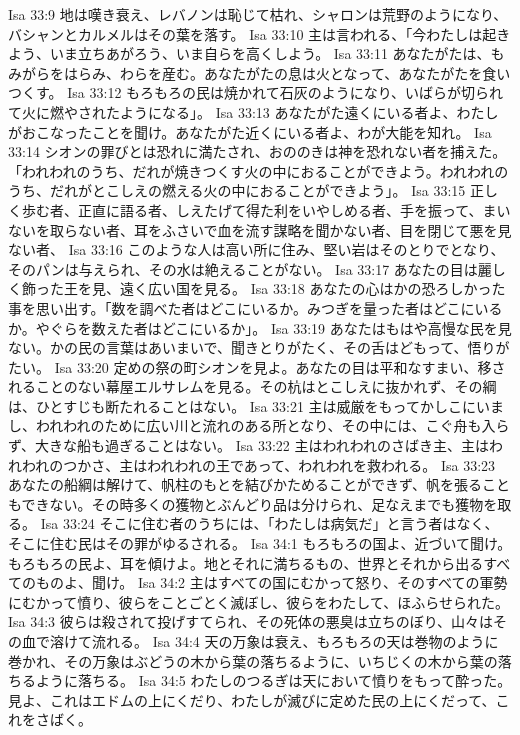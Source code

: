 Isa 33:9  地は嘆き衰え、レバノンは恥じて枯れ、シャロンは荒野のようになり、バシャンとカルメルはその葉を落す。
Isa 33:10  主は言われる、「今わたしは起きよう、いま立ちあがろう、いま自らを高くしよう。
Isa 33:11  あなたがたは、もみがらをはらみ、わらを産む。あなたがたの息は火となって、あなたがたを食いつくす。
Isa 33:12  もろもろの民は焼かれて石灰のようになり、いばらが切られて火に燃やされたようになる」。
Isa 33:13  あなたがた遠くにいる者よ、わたしがおこなったことを聞け。あなたがた近くにいる者よ、わが大能を知れ。
Isa 33:14  シオンの罪びとは恐れに満たされ、おののきは神を恐れない者を捕えた。「われわれのうち、だれが焼きつくす火の中におることができよう。われわれのうち、だれがとこしえの燃える火の中におることができよう」。
Isa 33:15  正しく歩む者、正直に語る者、しえたげて得た利をいやしめる者、手を振って、まいないを取らない者、耳をふさいで血を流す謀略を聞かない者、目を閉じて悪を見ない者、
Isa 33:16  このような人は高い所に住み、堅い岩はそのとりでとなり、そのパンは与えられ、その水は絶えることがない。
Isa 33:17  あなたの目は麗しく飾った王を見、遠く広い国を見る。
Isa 33:18  あなたの心はかの恐ろしかった事を思い出す。「数を調べた者はどこにいるか。みつぎを量った者はどこにいるか。やぐらを数えた者はどこにいるか」。
Isa 33:19  あなたはもはや高慢な民を見ない。かの民の言葉はあいまいで、聞きとりがたく、その舌はどもって、悟りがたい。
Isa 33:20  定めの祭の町シオンを見よ。あなたの目は平和なすまい、移されることのない幕屋エルサレムを見る。その杭はとこしえに抜かれず、その綱は、ひとすじも断たれることはない。
Isa 33:21  主は威厳をもってかしこにいまし、われわれのために広い川と流れのある所となり、その中には、こぐ舟も入らず、大きな船も過ぎることはない。
Isa 33:22  主はわれわれのさばき主、主はわれわれのつかさ、主はわれわれの王であって、われわれを救われる。
Isa 33:23  あなたの船綱は解けて、帆柱のもとを結びかためることができず、帆を張ることもできない。その時多くの獲物とぶんどり品は分けられ、足なえまでも獲物を取る。
Isa 33:24  そこに住む者のうちには、「わたしは病気だ」と言う者はなく、そこに住む民はその罪がゆるされる。
Isa 34:1  もろもろの国よ、近づいて聞け。もろもろの民よ、耳を傾けよ。地とそれに満ちるもの、世界とそれから出るすべてのものよ、聞け。
Isa 34:2  主はすべての国にむかって怒り、そのすべての軍勢にむかって憤り、彼らをことごとく滅ぼし、彼らをわたして、ほふらせられた。
Isa 34:3  彼らは殺されて投げすてられ、その死体の悪臭は立ちのぼり、山々はその血で溶けて流れる。
Isa 34:4  天の万象は衰え、もろもろの天は巻物のように巻かれ、その万象はぶどうの木から葉の落ちるように、いちじくの木から葉の落ちるように落ちる。
Isa 34:5  わたしのつるぎは天において憤りをもって酔った。見よ、これはエドムの上にくだり、わたしが滅びに定めた民の上にくだって、これをさばく。
